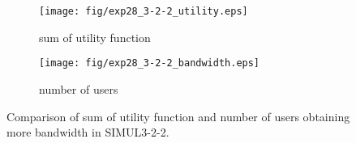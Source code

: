 \begin{figure}
	\begin{center}
		\begin{subfigure}[b]{0.8\textwidth}
			\centering
			\texttt{[image: fig/exp28\_3-2-2\_utility.eps]}
			\caption{sum of utility function}
			\label{figure:simul3_2_2_u_a}
		\end{subfigure}
		\begin{subfigure}[b]{0.8\textwidth}
			\centering
			\texttt{[image: fig/exp28\_3-2-2\_bandwidth.eps]}
			\caption{number of users}
			\label{figure:simul3_2_2_u_b}
		\end{subfigure}
		\caption{Comparison of sum of utility function and number of users obtaining more bandwidth in SIMUL3-2-2.}
		\label{figure:simul3_2_2_u}
	\end{center}
\end{figure}

\clearpage

